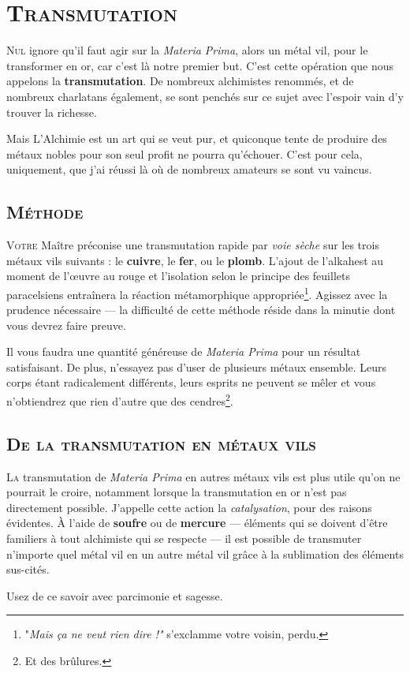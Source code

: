 \section{\textsc{Transmutation}}

\lettrine{N}{ul} ignore qu'il faut agir sur la \emph{Materia Prima}, alors un métal vil,
pour le transformer en or, car c'est là notre premier but. C'est cette
opération que nous appelons la \textbf{transmutation}. De nombreux
alchimistes renommés, et de nombreux charlatans également, se sont penchés sur
ce sujet avec l'espoir vain d'y trouver la richesse.

Mais L'Alchimie est un art qui se veut pur, et quiconque tente de produire
des métaux nobles pour son seul profit ne pourra qu'échouer. C'est pour cela,
uniquement, que j'ai réussi là où de nombreux amateurs se sont vu vaincus.

\subsection{\textsc{Méthode}}

\lettrine{V}{otre} Maître préconise une transmutation rapide par \emph{voie sèche} sur
les trois métaux vils suivants : le \textbf{cuivre}, le \textbf{fer}, ou le
\textbf{plomb}. L'ajout de l'alkahest au moment de l'œuvre au rouge et
l'isolation selon le principe des feuillets paracelsiens entraînera la réaction
métamorphique appropriée\footnote{"\textit{Mais ça ne veut rien dire !"}
s'exclamme votre voisin, perdu.}.
Agissez avec la prudence nécessaire — la difficulté de cette méthode réside dans la
minutie dont vous devrez faire preuve.

Il vous faudra une quantité généreuse de \emph{Materia Prima} pour un résultat
satisfaisant. De plus, n'essayez pas d'user de plusieurs métaux ensemble. Leurs
corps étant radicalement différents, leurs esprits ne peuvent se mêler et vous
n'obtiendrez que rien d'autre que des cendres\footnote{Et des brûlures.}.

\subsection{\textsc{De la transmutation en métaux vils}}

\lettrine{L}{a} transmutation de \emph{Materia Prima} en autres métaux vils est plus utile
qu'on ne pourrait le croire, notamment lorsque la transmutation en or n'est pas
directement possible. J'appelle cette action la \emph{catalysation}, pour des
raisons évidentes. À l'aide de \textbf{soufre} ou de \textbf{mercure} —
éléments qui se doivent d'être familiers à tout alchimiste qui se respecte — il
est possible de transmuter n'importe quel métal vil en un autre métal vil grâce
à la sublimation des éléments sus-cités.


Usez de ce savoir avec parcimonie et sagesse.
